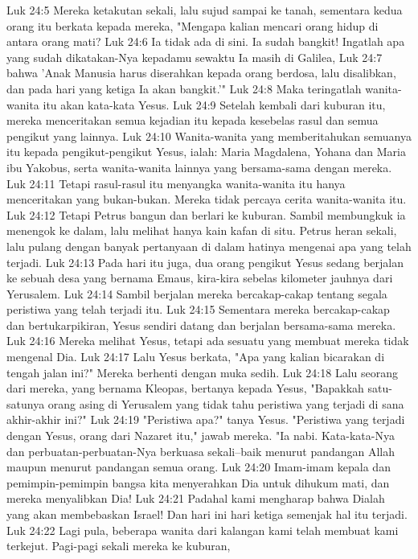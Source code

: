 Luk 24:5  Mereka ketakutan sekali, lalu sujud sampai ke tanah, sementara kedua orang itu berkata kepada mereka, "Mengapa kalian mencari orang hidup di antara orang mati?
Luk 24:6  Ia tidak ada di sini. Ia sudah bangkit! Ingatlah apa yang sudah dikatakan-Nya kepadamu sewaktu Ia masih di Galilea,
Luk 24:7  bahwa 'Anak Manusia harus diserahkan kepada orang berdosa, lalu disalibkan, dan pada hari yang ketiga Ia akan bangkit.'"
Luk 24:8  Maka teringatlah wanita-wanita itu akan kata-kata Yesus.
Luk 24:9  Setelah kembali dari kuburan itu, mereka menceritakan semua kejadian itu kepada kesebelas rasul dan semua pengikut yang lainnya.
Luk 24:10  Wanita-wanita yang memberitahukan semuanya itu kepada pengikut-pengikut Yesus, ialah: Maria Magdalena, Yohana dan Maria ibu Yakobus, serta wanita-wanita lainnya yang bersama-sama dengan mereka.
Luk 24:11  Tetapi rasul-rasul itu menyangka wanita-wanita itu hanya menceritakan yang bukan-bukan. Mereka tidak percaya cerita wanita-wanita itu.
Luk 24:12  Tetapi Petrus bangun dan berlari ke kuburan. Sambil membungkuk ia menengok ke dalam, lalu melihat hanya kain kafan di situ. Petrus heran sekali, lalu pulang dengan banyak pertanyaan di dalam hatinya mengenai apa yang telah terjadi.
Luk 24:13  Pada hari itu juga, dua orang pengikut Yesus sedang berjalan ke sebuah desa yang bernama Emaus, kira-kira sebelas kilometer jauhnya dari Yerusalem.
Luk 24:14  Sambil berjalan mereka bercakap-cakap tentang segala peristiwa yang telah terjadi itu.
Luk 24:15  Sementara mereka bercakap-cakap dan bertukarpikiran, Yesus sendiri datang dan berjalan bersama-sama mereka.
Luk 24:16  Mereka melihat Yesus, tetapi ada sesuatu yang membuat mereka tidak mengenal Dia.
Luk 24:17  Lalu Yesus berkata, "Apa yang kalian bicarakan di tengah jalan ini?" Mereka berhenti dengan muka sedih.
Luk 24:18  Lalu seorang dari mereka, yang bernama Kleopas, bertanya kepada Yesus, "Bapakkah satu-satunya orang asing di Yerusalem yang tidak tahu peristiwa yang terjadi di sana akhir-akhir ini?"
Luk 24:19  "Peristiwa apa?" tanya Yesus. "Peristiwa yang terjadi dengan Yesus, orang dari Nazaret itu," jawab mereka. "Ia nabi. Kata-kata-Nya dan perbuatan-perbuatan-Nya berkuasa sekali--baik menurut pandangan Allah maupun menurut pandangan semua orang.
Luk 24:20  Imam-imam kepala dan pemimpin-pemimpin bangsa kita menyerahkan Dia untuk dihukum mati, dan mereka menyalibkan Dia!
Luk 24:21  Padahal kami mengharap bahwa Dialah yang akan membebaskan Israel! Dan hari ini hari ketiga semenjak hal itu terjadi.
Luk 24:22  Lagi pula, beberapa wanita dari kalangan kami telah membuat kami terkejut. Pagi-pagi sekali mereka ke kuburan,
